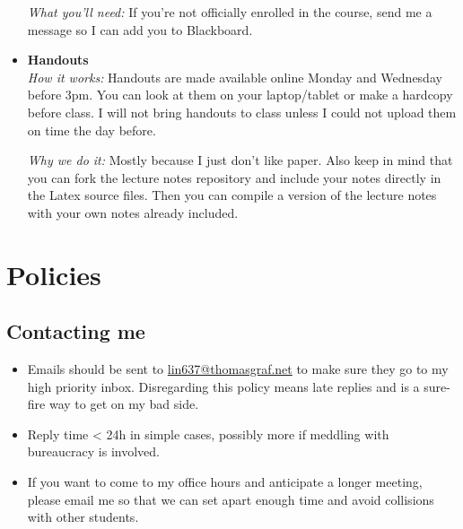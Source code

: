 \begin{itemize}
        \emph{What you'll need:}
        If you're not officially enrolled in the course, send me a message so I can add you to Blackboard.

    \item \textbf{Handouts}\\
        \emph{How it works:}
        Handouts are made available online Monday and Wednesday before 3pm.
        You can look at them on your laptop\slash tablet or make a hardcopy before class.
        I will not bring handouts to class unless I could not upload them on time the day before.

        \emph{Why we do it:}
        Mostly because I just don't like paper.
        Also keep in mind that you can fork the lecture notes repository and include your notes directly in the Latex source files.
        Then you can compile a version of the lecture notes with your own notes already included.
\end{itemize}


\section{Policies}

\subsection{Contacting me}
\begin{itemize}
    \item Emails should be sent to \href{mailto://lin637@thomasgraf.net}{lin637@thomasgraf.net} to make sure they go to my high priority inbox.
        Disregarding this policy means late replies and is a sure-fire way to get on my bad side.
    \item Reply time < 24h in simple cases, possibly more if meddling with bureaucracy is involved.
    \item If you want to come to my office hours and anticipate a longer meeting, please email me so that we can set apart enough time and avoid collisions with other students.
\end{itemize}



